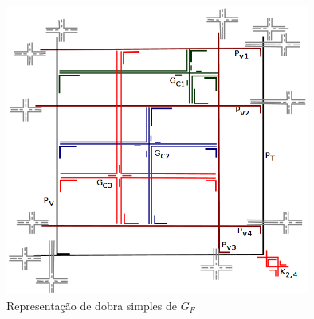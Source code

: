 \begin{figure}[htb]	
\center%
\includegraphics[width=10cm]{./img/formulaFGCompletaPies.png}
\caption{Representação de dobra simples de $G_F$}
\label{fig:gadgetFormulaCompletaPies}
\end{figure}
